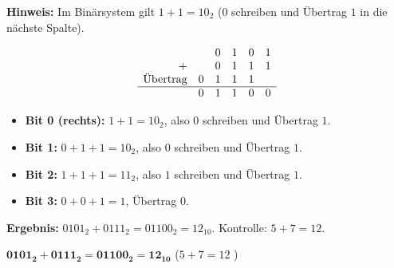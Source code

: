 \begin{frame}
\vspace{3mm}
\textbf{Hinweis:} Im Binärsystem gilt $1+1=10_2$ ($0$ schreiben und Übertrag $1$ in die nächste Spalte).
\end{frame}

\begin{frame}
\[
    \begin{array}{rccccc}
        &   & 0 & 1 & 0 & 1 \\
        + &   & 0 & 1 & 1 & 1 \\
        \text{Übertrag} & 0 & 1 & 1 & 1 &   \\\hline
        & 0 & 1 & 1 & 0 & 0
    \end{array}
\]
\vspace{2mm}
\begin{itemize}[<+->]
    \item \textbf{Bit 0 (rechts):} $1+1=10_2$, also $0$ schreiben und Übertrag $1$.
    \item \textbf{Bit 1:} $0+1+1=10_2$, also $0$ schreiben und Übertrag $1$.
    \item \textbf{Bit 2:} $1+1+1=11_2$, also $1$ schreiben und Übertrag $1$.
    \item \textbf{Bit 3:} $0+0+1=1$, Übertrag $0$.
\end{itemize}
\vspace{1mm}
\textbf{Ergebnis:} $0101_2+0111_2=01100_2=12_{10}$. Kontrolle: $5+7=12$.
\end{frame}

\begin{frame}
\vspace{1mm}
\begin{center}
\scalebox{0.7}{}
\end{center}
\end{frame}

\newcommand{\RCAinputSol}[2]{$#1_{#2} = \ifx a#1\ifcase#2 1\or 0\or 1\or 0\fi\else\ifcase#2 1\or 1\or 1\or 0\fi\fi$}
\newcommand{\RCAcarrySol}[1]{$c_{#1} = \mathbf{\ifnum#1=4 0\else 1\fi}$}
\newcommand{\RCAsumSol}[1]{$s_{#1} = \mathbf{\ifnum#1>1 1\else 0\fi}$}

\begin{frame}
\begingroup
\let\RCAinput\RCAinputSol
\let\RCAcarry\RCAcarrySol
\let\RCAsum\RCAsumSol
\begin{center}
\scalebox{0.7}{}
\end{center}
\endgroup
\vspace{-2mm}
\begin{center}
$\mathbf{0101_2 + 0111_2 = 01100_2 = 12_{10}}$ \quad ($5 + 7 = 12$ \checkmark)
\end{center}
\end{frame}

